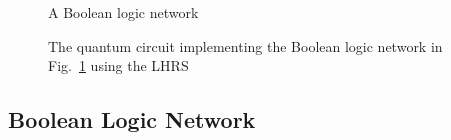 

\begin{figure}[t]
    \centering
    
    \caption{A Boolean logic network}
    \label{fig-lut-network}
\end{figure}

\begin{figure}[t]
    \centering
    \scalebox{1}{}
    \caption{The quantum circuit implementing the Boolean logic network in Fig.~\ref{fig-lut-network} using the LHRS }
    \label{fig-lut-qc}
\end{figure}


\subsection{Boolean Logic Network}

